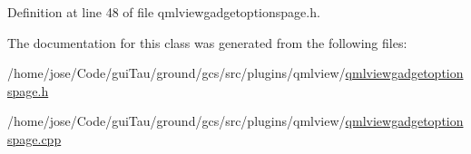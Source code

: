 Definition at line 48 of file qmlviewgadgetoptionspage.\-h.



The documentation for this class was generated from the following files\-:\begin{DoxyCompactItemize}
\item 
/home/jose/\-Code/gui\-Tau/ground/gcs/src/plugins/qmlview/\hyperlink{qmlviewgadgetoptionspage_8h}{qmlviewgadgetoptionspage.\-h}\item 
/home/jose/\-Code/gui\-Tau/ground/gcs/src/plugins/qmlview/\hyperlink{qmlviewgadgetoptionspage_8cpp}{qmlviewgadgetoptionspage.\-cpp}\end{DoxyCompactItemize}

